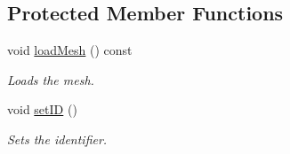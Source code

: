 \subsection*{Protected Member Functions}
\begin{DoxyCompactItemize}
\item 
\hypertarget{class_objects_1_1_i_object_a0a5cb41bb995dcfb01c3880600ae8340}{void \hyperlink{class_objects_1_1_i_object_a0a5cb41bb995dcfb01c3880600ae8340}{load\-Mesh} () const }\label{class_objects_1_1_i_object_a0a5cb41bb995dcfb01c3880600ae8340}

\begin{DoxyCompactList}\small\item\em Loads the mesh. \end{DoxyCompactList}\item 
\hypertarget{class_objects_1_1_i_object_a7bd6a849a416450530b991dfb7068715}{void \hyperlink{class_objects_1_1_i_object_a7bd6a849a416450530b991dfb7068715}{set\-I\-D} ()}\label{class_objects_1_1_i_object_a7bd6a849a416450530b991dfb7068715}

\begin{DoxyCompactList}\small\item\em Sets the identifier. \end{DoxyCompactList}\end{DoxyCompactItemize}
